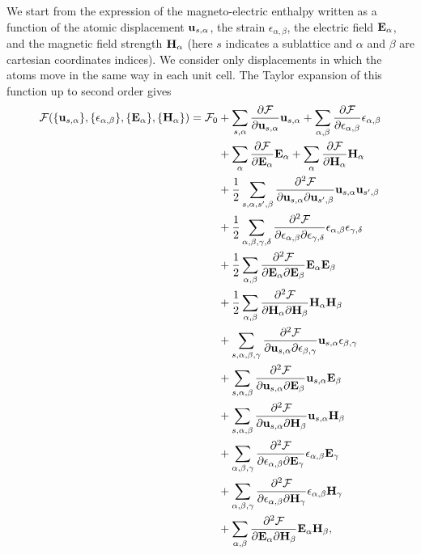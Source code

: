 \documentclass[12pt,a4paper]{article}
\begin{document}
We start from the expression of the magneto-electric enthalpy 
written as a function of the atomic displacement 
${\bf u}_{s,\alpha}$, the strain $\epsilon_{\alpha,\beta}$, the electric
field ${\bf E}_\alpha$, and the magnetic field strength ${\bf H}_\alpha$
(here $s$ indicates a sublattice and $\alpha$ and $\beta$ are cartesian
coordinates indices). We consider only displacements in which the
atoms move in the same way in each unit cell.
The Taylor expansion of this function up to second order gives
\begin{align}
\mathcal{F}(\{{\bf u}_{s,\alpha}\}, \{\epsilon_{\alpha,\beta}\},
\{ {\bf E}_\alpha\}, \{{\bf H}_\alpha\})=\mathcal{F}_0 &+
\sum_{s,\alpha} {\partial \mathcal{F} \over \partial 
{\bf u}_{s,\alpha}} {\bf u}_{s,\alpha}+ \sum_{\alpha,\beta}
{\partial \mathcal{F} \over \partial 
\epsilon_{\alpha,\beta}} \epsilon_{\alpha,\beta} \nonumber \\ 
&+\sum_{\alpha}
{\partial \mathcal{F} \over \partial 
{\bf E}_\alpha} {\bf E}_\alpha + 
\sum_{\alpha}
{\partial \mathcal{F} \over \partial 
{\bf H}_\alpha} {\bf H}_\alpha \nonumber \\
&+{1\over 2}
\sum_{s,\alpha,s',\beta} {\partial^2 \mathcal{F} \over \partial 
{\bf u}_{s,\alpha} \partial {\bf u}_{s',\beta}} {\bf u}_{s,\alpha}
{\bf u}_{s',\beta}\nonumber \\
&+ {1\over 2}\sum_{\alpha,\beta,\gamma,\delta} 
{\partial^2 \mathcal{F} \over \partial 
\epsilon_{\alpha,\beta} \partial \epsilon_{\gamma,\delta}} 
\epsilon_{\alpha,\beta}
\epsilon_{\gamma,\delta} \nonumber \\
&+ {1\over 2} \sum_{\alpha,\beta} 
{\partial^2 \mathcal{F} \over \partial 
{\bf E}_{\alpha} \partial {\bf E}_{\beta}} 
{\bf E}_{\alpha}
{\bf E}_{\beta} \nonumber \\
&+ {1\over 2} \sum_{\alpha,\beta} 
{\partial^2 \mathcal{F} \over \partial 
{\bf H}_{\alpha} \partial {\bf H}_{\beta}} 
{\bf H}_{\alpha}
{\bf H}_{\beta} \nonumber \\
&+ \sum_{s,\alpha,\beta,\gamma} {\partial^2 \mathcal{F} \over \partial 
{\bf u}_{s,\alpha} \partial \epsilon_{\beta,\gamma}} {\bf u}_{s,\alpha}
\epsilon_{\beta,\gamma}\nonumber \\
&+ \sum_{s,\alpha,\beta} {\partial^2 \mathcal{F} \over \partial 
{\bf u}_{s,\alpha} \partial {\bf E}_{\beta}} {\bf u}_{s,\alpha}
{\bf E}_{\beta} \nonumber \\
&+ \sum_{s,\alpha,\beta} {\partial^2 \mathcal{F} \over \partial 
{\bf u}_{s,\alpha} \partial {\bf H}_{\beta}} {\bf u}_{s,\alpha}
{\bf H}_{\beta} \nonumber \\
&+ \sum_{\alpha,\beta,\gamma} {\partial^2 \mathcal{F} \over \partial 
\epsilon_{\alpha,\beta} \partial {\bf E}_{\gamma}} \epsilon_{\alpha,\beta}
{\bf E}_{\gamma} \nonumber \\
&+ \sum_{\alpha,\beta,\gamma} {\partial^2 \mathcal{F} \over \partial 
\epsilon_{\alpha,\beta} \partial {\bf H}_{\gamma}} \epsilon_{\alpha,\beta}
{\bf H}_{\gamma} \nonumber \\
&+ \sum_{\alpha,\beta} {\partial^2 \mathcal{F} \over \partial 
{\bf E}_{\alpha} \partial {\bf H}_{\beta}} {\bf E}_{\alpha}
{\bf H}_{\beta},
\end{align}
\end{document}
